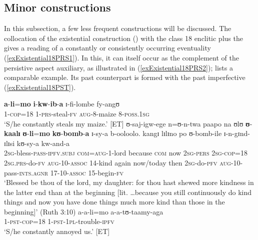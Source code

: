 \subsection{Minor constructions}
\label{MinorConstuctions}In this subsection, a few less frequent constructions will be discussed. The collocation of the existential construction () with the  class 18 enclitic plus the  gives a reading of a constantly or consistently occurring eventuality (\ref{exExistential18PRS1}). In this, it can itself occur as the complement of the persistive aspect auxiliary, as illustrated in (\ref{exExistential18PRS2}); \citet[125]{NurseD1979} lists a comparable example. Its past counterpart is formed with the past imperfective (\ref{exExistential18PST}).

\largerpage[2]
\begin{exe}
\ex \label{exExistential18PRS1}\gll \textbf{a}-\textbf{li}=\textbf{mo} \textbf{i}-\textbf{kw}-\textbf{ib}-\textbf{a} ɪ-fi-lombe fy-angʊ\\
1-\textsc{cop}=18 1-\textsc{prs}-steal-\textsc{fv} \textsc{aug}-8-maize 8-\textsc{poss.1sg}\\
\glt \lq S/he constantly steals my maize.' [ET]
\ex \label{exExistential18PRS2}
\gll ʊ-saj-igw-ege n=ʊ-n-twa paapo na ʊlʊ \textbf{ʊ}-\textbf{kaalɪ} \textbf{ʊ}-\textbf{li}=\textbf{mo} \textbf{kʊ}-\textbf{bomb}-\textbf{a} ɪ-sy-a b-ooloolo. kangɪ lɪlɪno po ʊ-bomb-ile ɪ-n-gɪnd-ɪlɪsi kʊ-sy-a kw-and-a\\
\textsc{2sg}-bless-\textsc{pass}-\textsc{ipfv.subj} \textsc{com}=\textsc{aug}-1-lord because \textsc{com} now \textsc{2sg}-\textsc{pers} \textsc{2sg}-\textsc{cop}=18 \textsc{2sg.prs}-do-\textsc{fv} \textsc{aug}-10-\textsc{assoc} 14-kind again now/today then \textsc{2sg}-do-\textsc{pfv} \textsc{aug}-10-pass-\textsc{ints.agnr} 17-10-\textsc{assoc} 15-begin-\textsc{fv}\\
\glt \lq Blessed be thou of the lord, my daughter: for thou hast shewed more kindness in the latter end than at the beginning [lit. \ldots because you still continuously do kind things and now you have done things much more kind than those in the beginning]' (Ruth 3:10)
\ex \label{exExistential18PST} \gll a-a-li=mo a-a-tʊ-taamy-aga\\
1-\textsc{pst}-\textsc{cop}=18 1-\textsc{pst}-\textsc{1pl}-trouble-\textsc{ipfv}\\
\glt \lq S/he constantly annoyed us.' [ET]
\end{exe}

